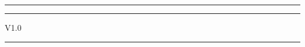 \makeatletter
{}



\renewcommand{\headrulewidth}{0pt}

{\color{myblue}\rule{30pt}{2.1cm}}
\hspace{1cm}
\begin{minipage}[b]{18cm}
    {\fontsize{28pt}{18pt}\textbf{\color{mygray}\@title}}
\end{minipage}

\vspace{48em}


\begin{flushright}
    \setlength\parindent{8em}
    \begin{minipage}[b]{6cm}
        \sphinxlogo
    \end{minipage}
    \hspace{0.2cm}
    \rule{3pt}{1.9cm}
    \hspace{0.2cm}
    \begin{minipage}[b]{6cm}
        {\large{V1.0}}\smallskip\newline
        {\large{\@author}}\smallskip\newline
        {\large{\@date}}\smallskip
    \end{minipage}
    {\color{myblue}\rule{30pt}{1.9cm}}
\end{flushright}


\restoregeometry
\makeatother
